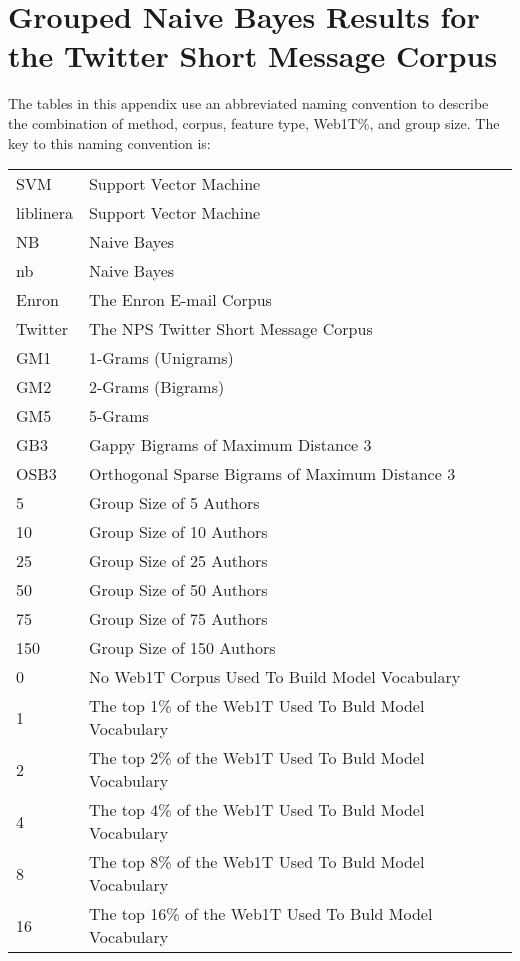 \chapter{Grouped Naive Bayes Results for the Twitter Short Message Corpus}

The tables in this appendix use an abbreviated naming convention to describe the combination of method, corpus, feature type, Web1T\%, and group size.  The key to this naming convention is:

\begin{center}
\begin{table}[htbp!]
	\begin{center}
	\begin{tabular}{ll}
	SVM & Support Vector Machine\\
	liblinera & Support Vector Machine\\
	NB & Naive Bayes\\
	nb & Naive Bayes\\
	
	Enron & The Enron E-mail Corpus\\
	Twitter & The NPS Twitter Short Message Corpus\\
	
	GM1 & 1-Grams (Unigrams)\\
	GM2 & 2-Grams (Bigrams)\\
	GM5 & 5-Grams\\
	GB3 & Gappy Bigrams of Maximum Distance 3\\
	OSB3 & Orthogonal Sparse Bigrams of Maximum Distance 3\\
		
	5 & Group Size of 5 Authors\\
	10 & Group Size of 10 Authors\\
	25 & Group Size of 25 Authors\\
	50 & Group Size of 50 Authors\\
	75 & Group Size of 75 Authors\\
	150 & Group Size of 150 Authors\\
	
	0 & No Web1T Corpus Used To Build Model Vocabulary\\
	1 & The top 1\% of the Web1T Used To Buld Model Vocabulary\\
	2 & The top 2\% of the Web1T Used To Buld Model Vocabulary\\
	4 & The top 4\% of the Web1T Used To Buld Model Vocabulary\\
	8 & The top 8\% of the Web1T Used To Buld Model Vocabulary\\
	16 & The top 16\% of the Web1T Used To Buld Model Vocabulary\\
	\end{tabular}
	\end{center}
\end{table}
\end{center}


